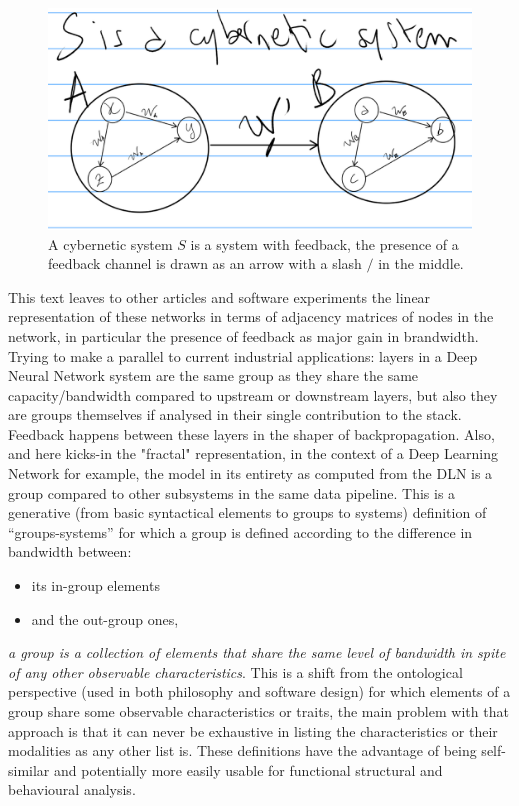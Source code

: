\documentclass[14pt]{extarticle}
\begin{document}
\begin{figure}[htbp]
\begin{minipage}[t]{0.90\linewidth}
    \includegraphics[width=\linewidth]{Fig__4_cybernetic_systems.eps}
	\caption{A cybernetic system \(S\) is a system with feedback, the presence of a feedback channel is drawn as an arrow with a slash \(/\) in the middle.}%
	\label{fig:fig4}
\end{minipage}%
\end{figure}

\hspace*{15mm}This text leaves to other articles and software experiments the linear representation of these networks in terms of adjacency matrices of nodes in the network, in particular the presence of feedback as major gain in brandwidth. Trying to make a parallel to current industrial applications: layers in a Deep Neural Network system are the same group as they share the same capacity/bandwidth compared to upstream or downstream layers, but also they are groups themselves if analysed in their single contribution to the stack. Feedback happens between these layers in the shaper of backpropagation. Also, and here kicks-in the "fractal" representation, in the context of a Deep Learning Network for example, the model in its entirety as computed from the DLN is a group compared to other subsystems in the same data pipeline.
\newline
\hspace*{15mm}This is a generative (from basic syntactical elements to groups to systems) definition of “groups-systems” for which a group is defined according to the difference in bandwidth between:
\begin{itemize}
\item its in-group elements
\item and the out-group ones,
\end{itemize} 
\textit{a group is a collection of elements that share the same level of bandwidth in spite of any other observable characteristics}.
This is a shift from the ontological perspective (used in both philosophy and software design) for which elements of a group share some observable characteristics or traits, the main problem with that approach is that it can never be exhaustive in listing the characteristics or their modalities as any other list is. These definitions have the advantage of being self-similar and potentially more easily usable for functional structural and behavioural analysis.
\end{document}
